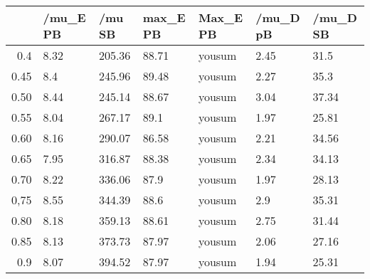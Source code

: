 \begin{table}[ht]
\centering
\begin{tabular}{rllllll}
  \hline
 & /mu\_E PB & /mu SB & max\_E PB & Max\_E PB & /mu\_D pB & /mu\_D SB \\ 
  \hline
0.4 & 8.32 & 205.36 & 88.71 & yousum & 2.45 & 31.5 \\ 
  0.45 & 8.4 & 245.96 & 89.48 & yousum & 2.27 & 35.3 \\ 
  0.50 & 8.44 & 245.14 & 88.67 & yousum & 3.04 & 37.34 \\ 
  0.55 & 8.04 & 267.17 & 89.1 & yousum & 1.97 & 25.81 \\ 
  0.60 & 8.16 & 290.07 & 86.58 & yousum & 2.21 & 34.56 \\ 
  0.65 & 7.95 & 316.87 & 88.38 & yousum & 2.34 & 34.13 \\ 
  0.70 & 8.22 & 336.06 & 87.9 & yousum & 1.97 & 28.13 \\ 
  0,75 & 8.55 & 344.39 & 88.6 & yousum & 2.9 & 35.31 \\ 
  0.80 & 8.18 & 359.13 & 88.61 & yousum & 2.75 & 31.44 \\ 
  0.85 & 8.13 & 373.73 & 87.97 & yousum & 2.06 & 27.16 \\ 
  0.9 & 8.07 & 394.52 & 87.97 & yousum & 1.94 & 25.31 \\ 
   \hline
\end{tabular}
\end{table}
